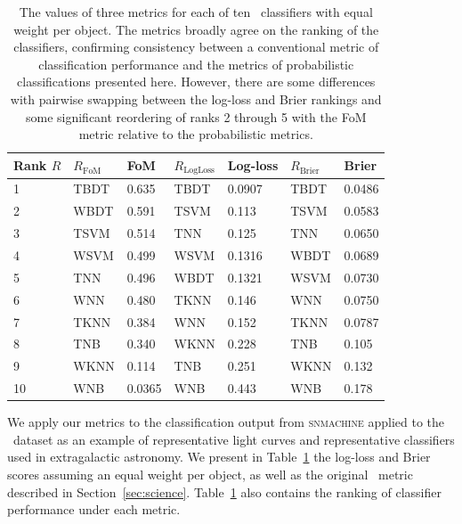 \begin{table}[]
	\begin{centering}
\begin{tabular}{lllllll}%
Rank $R$ & $R_\mathrm{FoM}$ & FoM & %
$R_\mathrm{LogLoss}$ & Log-loss & $R_\mathrm{Brier}$ & Brier \\
\hline
1  & TBDT & 0.635  %
& TBDT & 0.0907 & TBDT & 0.0486 \\
2  & WBDT & 0.591  %
& TSVM & 0.113  & TSVM & 0.0583 \\
3  & TSVM & 0.514  %
& TNN  & 0.125  & TNN  & 0.0650 \\
4  & WSVM & 0.499  %
& WSVM & 0.1316 & WBDT & 0.0689 \\
5  & TNN  & 0.496  %
& WBDT & 0.1321 & WSVM & 0.0730 \\
6  & WNN  & 0.480  %
& TKNN & 0.146  & WNN  & 0.0750 \\
7  & TKNN & 0.384  %
& WNN  & 0.152  & TKNN & 0.0787 \\
8  & TNB  & 0.340  %
& WKNN & 0.228  & TNB  & 0.105  \\
9  & WKNN & 0.114  %
& TNB  & 0.251  & WKNN & 0.132  \\
10 & WNB  & 0.0365 %
& WNB  & 0.443  & WNB  & 0.178  \\
\end{tabular}
	\caption{
	The values of three metrics for each of ten \snmachine\ classifiers with equal weight per object.
	The metrics broadly agree on the ranking of the classifiers, confirming consistency between a conventional metric of classification performance and the metrics of probabilistic classifications presented here.
	However, there are some differences with pairwise swapping between the log-loss and Brier rankings and some significant reordering of ranks 2 through 5 with the FoM metric relative to the probabilistic metrics.
	}
	\label{tab:snmachineresults}
	\end{centering}
\end{table}

We apply our metrics to the classification output from \textsc{snmachine} applied to the \snphotcc\ dataset as an example of representative light curves and representative classifiers used in extragalactic astronomy.
We present in Table~\ref{tab:snmachineresults} the log-loss and Brier scores assuming an equal weight per object, as well as the original \snphotcc\ metric described in Section~\ref{sec:science}.
Table~\ref{tab:snmachineresults} also contains the ranking of classifier performance under each metric.

